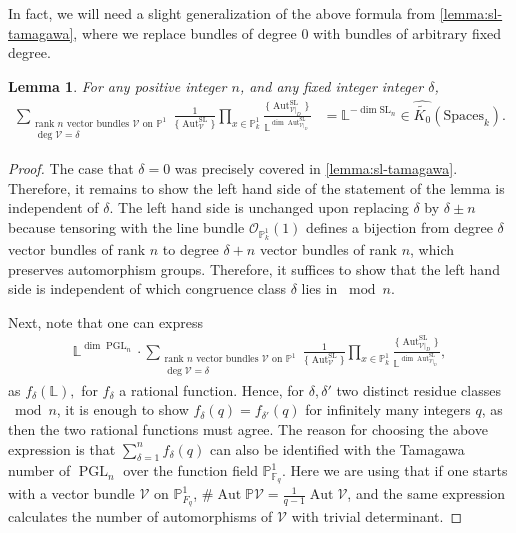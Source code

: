 \documentclass[12 pt]{amsart}
\theoremstyle{plain}
\newtheorem{lemma}[theorem]{Lemma}
\theoremstyle{definition}
\theoremstyle{remark}
\numberwithin{equation}{section}
\newcommand\bl{\mathbb L}
\newcommand\bp{\mathbb P}
\newcommand\sco{\mathscr O}
\newcommand\scv{\mathscr V}
\newcommand\grcSpaces{\widehat{\widetilde{K_0}}(\mathrm{Spaces}_k)} %
\DeclareMathOperator\pgl{PGL}
\DeclareMathOperator\aut{Aut}
\renewcommand\sl{\mathrm{SL}}
\begin{document}
In fact, we will need a slight generalization of the above formula from
\autoref{lemma:sl-tamagawa}, where we replace bundles of degree $0$ with bundles
of arbitrary fixed degree.

\begin{lemma} \label{lemma:pgl-tamagawa} For any positive integer $n$, and any
	fixed integer integer $\delta$,
	\begin{align*} \sum_{\substack{\text{rank $n$ vector bundles $\scv$ on
		$\bp^1$} \\ \deg \scv = \delta}}
		\frac{1}{\{\aut^{\sl}_{\scv}\}}  \prod_{x \in
		\bp^1_k}\frac{\{\aut^{\sl}_{\scv|_D}\}}{\bl^{\dim
		\aut^{\sl}_{\scv|_D}}} &= \bl^{-\dim \sl_n} \in
		\grcSpaces.  \end{align*} \end{lemma} 
\begin{proof}
	The case that $\delta = 0$ was precisely covered in
	\autoref{lemma:sl-tamagawa}. Therefore, it remains to show the left hand
	side of the statement of the lemma is independent of $\delta$.
	The left hand side is unchanged upon replacing $\delta$ by $\delta \pm
	n$ because tensoring with the line bundle $\sco_{\bp^1_k}(1)$ defines a
	bijection from degree $\delta$ vector bundles of rank $n$ to degree $\delta + n$
	vector bundles of rank $n$, which preserves automorphism groups.
	Therefore, it suffices to show that the left hand side is independent of
	which congruence class $\delta$ lies in $\bmod n$.

	Next, note that one can express
	\begin{align*}
	\mathbb L^{\dim \pgl_n} \cdot \sum_{\substack{\text{rank $n$ vector bundles $\scv$ on
	$\bp^1$} \\ \deg \scv = \delta}}
	\frac{1}{\{\aut^{\sl}_{\scv}\}}
	\prod_{x \in
		\bp^1_k}\frac{\{\aut^{\sl}_{\scv|_D}\}}{\bl^{\dim
		\aut^{\sl}_{\scv|_D}}},
	\end{align*}
	as $f_\delta(\mathbb L),$ for $f_\delta$ a rational function. 
	Hence, for $\delta, \delta'$ two distinct residue classes $\bmod
	n$, it is enough to show $f_\delta(q) =	f_{\delta'}(q)$ for
	infinitely many integers $q$, as then the two rational functions
	must agree.
	The reason for choosing the above expression is that $\sum_{\delta=1}^n
	f_\delta(q)$ can also be identified with the Tamagawa number of $\pgl_n$
	over the function field $\mathbb P^1_{\mathbb F_q}$. Here we are using
	that if one starts with a vector bundle $\scv$ on $\mathbb P^1_{F_q}$,
	$\# \aut \mathbb P\scv =	\frac{1}{q-1} \aut \scv$, and the same
	expression calculates the number of automorphisms of $\scv$ with trivial
	determinant.


\end{proof}
\end{document}
